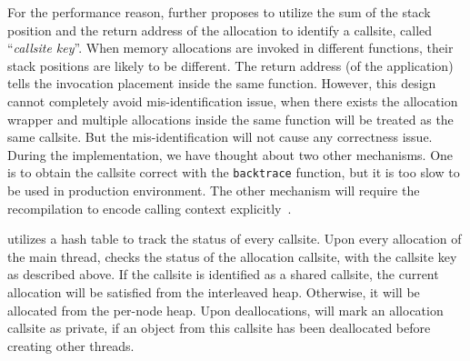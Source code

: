 For the performance reason, \NA{} further proposes to utilize the sum of the stack position and the return address of the allocation to identify a callsite, called ``\textit{callsite key}''. 
  When memory allocations are invoked in different functions, their stack positions are likely to be different. The return address (of the application) tells the invocation placement inside the same function. However, this design cannot completely avoid mis-identification issue,  when there exists the allocation wrapper and multiple allocations inside the same function will be treated as the same callsite. But the mis-identification will not cause any correctness issue. During the implementation, we have thought about two other mechanisms. One is to obtain the callsite correct with the \texttt{backtrace} function, but it is too slow to be used in production environment. The other mechanism will require the recompilation to encode calling context explicitly~\cite{DBLP:conf/icse/SumnerZWZ10, DBLP:conf/cgo/ZengR0AJ014}.
  

\NA{} utilizes a hash table to track the status of every callsite. Upon every allocation of the main thread, \NA{} checks the status of the allocation callsite, with the callsite key as described above. If the callsite is identified as a shared callsite, the current allocation will be satisfied from the interleaved heap. Otherwise, it will be allocated from the per-node heap. Upon deallocations, \NM{} will  mark an allocation callsite as private, if an object from this callsite has been deallocated before creating other threads. 



